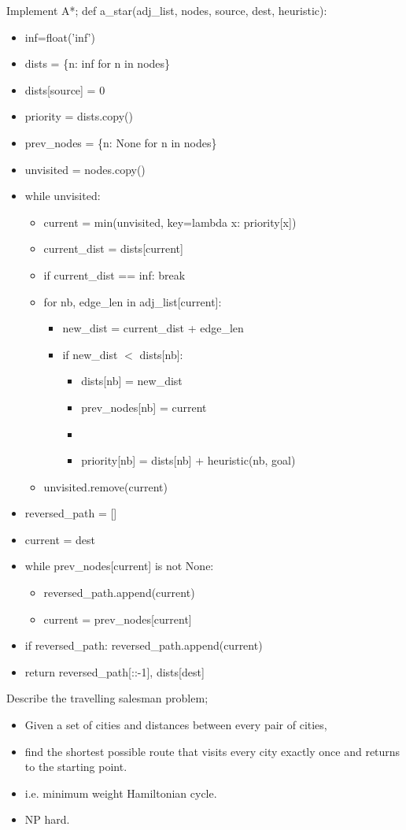 \documentclass{article}
\begin{document}
Implement A*; def a\_star(adj\_list, nodes, source, dest, heuristic):\begin{itemize} \item inf=float('inf') \item dists = \{n: inf for n in nodes\} \item dists[source] = 0 \item priority = dists.copy() \item prev\_nodes = \{n: None for n in nodes\} \item unvisited = nodes.copy() \item while unvisited: \begin{itemize} \item current = min(unvisited, key=lambda x: priority[x]) \item current\_dist = dists[current] \item if current\_dist == inf: break \item for nb, edge\_len in adj\_list[current]: \begin{itemize} \item new\_dist = current\_dist + edge\_len \item if new\_dist $<$ dists[nb]: \begin{itemize} \item dists[nb] = new\_dist \item prev\_nodes[nb] = current \item \item priority[nb] = dists[nb] + heuristic(nb, goal) \end{itemize} \end{itemize} \item unvisited.remove(current) \end{itemize} \item reversed\_path = [] \item current = dest \item while prev\_nodes[current] is not None: \begin{itemize} \item reversed\_path.append(current) \item current = prev\_nodes[current] \end{itemize} \item if reversed\_path: reversed\_path.append(current) \item return reversed\_path[::-1], dists[dest] \end{itemize}

Describe the travelling salesman problem; \begin{itemize} \item Given a set of cities and distances between every pair of cities, \item find the shortest possible route that visits every city exactly once and returns to the starting point.  \item i.e. minimum weight Hamiltonian cycle.  \item NP hard.  \end{itemize}
\end{document}
